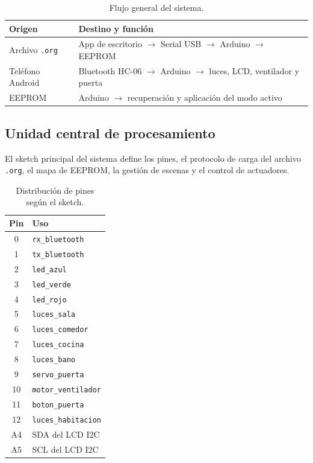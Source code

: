 \documentclass[12pt,a4paper]{article}
\begin{document}
\begin{table}[H]
    \centering
    \caption{Flujo general del sistema.}
    \begin{tabular}{p{5.5cm}p{8cm}}
        \toprule
        \textbf{Origen} & \textbf{Destino y función} \\
        \midrule
        Archivo \texttt{.org} & App de escritorio $\rightarrow$ Serial USB $\rightarrow$ Arduino $\rightarrow$ EEPROM \\
        Teléfono Android & Bluetooth HC-06 $\rightarrow$ Arduino $\rightarrow$ luces, LCD, ventilador y puerta \\
        EEPROM & Arduino $\rightarrow$ recuperación y aplicación del modo activo \\
        \bottomrule
    \end{tabular}
\end{table}

\subsection{Unidad central de procesamiento}
El sketch principal del sistema define los pines, el protocolo de carga del archivo \texttt{.org}, el mapa de EEPROM, la gestión de escenas y el control de actuadores.

\begin{table}[H]
    \centering
    \caption{Distribución de pines según el sketch.}
    \begin{tabular}{c p{9.5cm}}
        \toprule
        \textbf{Pin} & \textbf{Uso} \\
        \midrule
        0 & \texttt{rx\_bluetooth} \\
        1 & \texttt{tx\_bluetooth} \\
        2 & \texttt{led\_azul} \\
        3 & \texttt{led\_verde} \\
        4 & \texttt{led\_rojo} \\
        5 & \texttt{luces\_sala} \\
        6 & \texttt{luces\_comedor} \\
        7 & \texttt{luces\_cocina} \\
        8 & \texttt{luces\_bano} \\
        9 & \texttt{servo\_puerta} \\
        10 & \texttt{motor\_ventilador} \\
        11 & \texttt{boton\_puerta} \\
        12 & \texttt{luces\_habitacion} \\
        A4 & SDA del LCD I2C \\
        A5 & SCL del LCD I2C \\
        \bottomrule
    \end{tabular}
\end{table}
\end{document}
